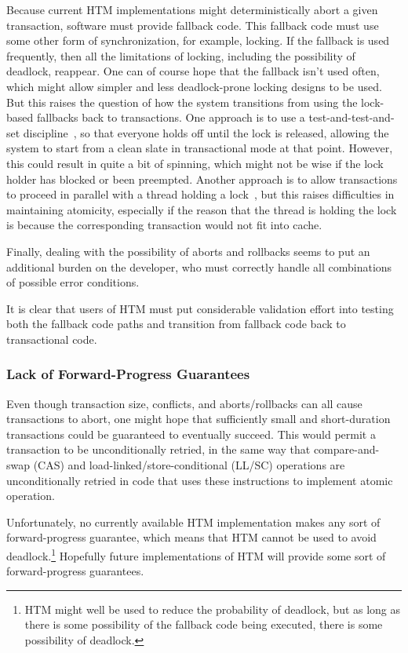 Because current HTM implementations might deterministically abort a
given transaction, software must provide fallback code.
This fallback code must use some other form of synchronization, for
example, locking.
If the fallback is used frequently, then all the limitations of locking,
including the possibility of deadlock, reappear.
One can of course hope that the fallback isn't used often, which might
allow simpler and less deadlock-prone locking designs to be used.
But this raises the question of how the system transitions from using
the lock-based fallbacks back to transactions.
One approach is to use a test-and-test-and-set discipline~\cite{Martinez02a},
so that everyone holds off until the lock is released, allowing the
system to start from a clean slate in transactional mode at that point.
However, this could result in quite a bit of spinning, which might not
be wise if the lock holder has blocked or been preempted.
Another approach is to allow transactions to proceed in parallel with
a thread holding a lock~\cite{Martinez02a}, but this raises difficulties
in maintaining atomicity, especially if the reason that the thread is
holding the lock is because the corresponding transaction would not fit
into cache.

Finally, dealing with the possibility of aborts and rollbacks seems to
put an additional burden on the developer, who must correctly handle
all combinations of possible error conditions.

It is clear that users of HTM must put considerable validation effort
into testing both the fallback code paths and transition from fallback
code back to transactional code.

\subsubsection{Lack of Forward-Progress Guarantees}
\label{sec:future:Lack of Forward-Progress Guarantees}

Even though transaction size, conflicts, and aborts/rollbacks can all
cause transactions to abort, one might hope that sufficiently small and
short-duration transactions could be guaranteed to eventually succeed.
This would permit a transaction to be unconditionally retried, in the
same way that compare-and-swap (CAS) and load-linked/store-conditional
(LL/SC) operations are unconditionally retried in code that uses these
instructions to implement atomic operation.

Unfortunately, no currently available HTM implementation makes any
sort of forward-progress guarantee, which means that HTM cannot be
used to avoid deadlock.\footnote{
	HTM might well be used to reduce the probability of deadlock,
	but as long as there is some possibility of the fallback
	code being executed, there is some possibility of deadlock.}
Hopefully future implementations of HTM will provide some sort of
forward-progress guarantees.

